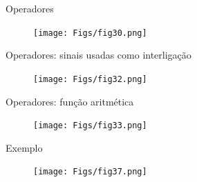 \documentclass[aspectratio=169]{beamer}
\begin{document}
\begin{frame}{Operadores}
	\justifying
	
	
	\begin{figure}[h]
		\centering
		\texttt{[image: Figs/fig30.png]}
	\end{figure}
	
	
\end{frame}
\begin{frame}{Operadores: sinais usadas como interligação}
	\justifying
	
	
	\begin{figure}[h]
		\centering
		\texttt{[image: Figs/fig32.png]}
	\end{figure}
	
	
\end{frame}
\begin{frame}{Operadores: função aritmética}
	\justifying
	
	
	\begin{figure}[h]
		\centering
		\texttt{[image: Figs/fig33.png]}
	\end{figure}
	
	
\end{frame}
\begin{frame}{Exemplo}
	\justifying
	
	
	\begin{figure}[h]
		\centering
		\texttt{[image: Figs/fig37.png]}
	\end{figure}
	
	
\end{frame}
\end{document}
